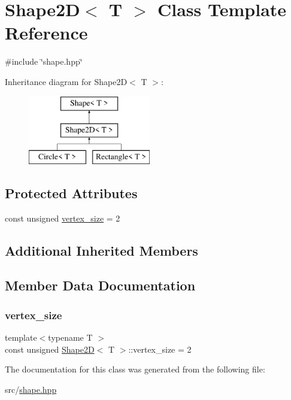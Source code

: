 \hypertarget{classShape2D}{}\section{Shape2D$<$ T $>$ Class Template Reference}
\label{classShape2D}


{\ttfamily \#include \char`\"{}shape.\+hpp\char`\"{}}

Inheritance diagram for Shape2D$<$ T $>$\+:\begin{figure}[H]
\begin{center}
\leavevmode
\includegraphics[height=3.000000cm]{classShape2D}
\end{center}
\end{figure}
\subsection*{Protected Attributes}
\begin{DoxyCompactItemize}
\item 
const unsigned \mbox{\hyperlink{classShape2D_a13c74ee57dc9398d50b5b1eabf81e273}{vertex\+\_\+size}} = 2
\end{DoxyCompactItemize}
\subsection*{Additional Inherited Members}


\subsection{Member Data Documentation}
\mbox{\label{classShape2D_a13c74ee57dc9398d50b5b1eabf81e273}} 
\subsubsection{\texorpdfstring{vertex\+\_\+size}{vertex\_size}}
{\footnotesize\ttfamily template$<$typename T $>$ \\
const unsigned \mbox{\hyperlink{classShape2D}{Shape2D}}$<$ T $>$\+::vertex\+\_\+size = 2\hspace{0.3cm}{\ttfamily [protected]}}



The documentation for this class was generated from the following file\+:\begin{DoxyCompactItemize}
\item 
src/\mbox{\hyperlink{shape_8hpp}{shape.\+hpp}}\end{DoxyCompactItemize}
